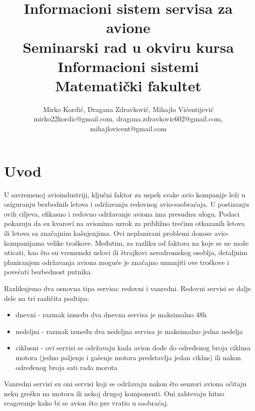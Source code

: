 \documentclass[a4paper]{article}
\begin{document}
\title{Informacioni sistem servisa za avione\\ \small{Seminarski rad u okviru kursa\\Informacioni sistemi\\ Matematički fakultet}}

\author{Mirko Kordić, Dragana Zdravković, Mihajlo Vićentijević\\ mirko22kordic@gmail.com, dragana.zdravkovic602@gmail.com, \\mihajlovicent@gmail.com}


\maketitle

\tableofcontents

\newpage

\section{Uvod}
\label{sec:uvod}
U savremenoj avioindustriji, ključni faktor za uspeh svake avio kompanije leži u osiguranju bezbednih letova i održavanju redovnog avio-saobraćaja. U postizanju ovih ciljeva, efikasno i redovno održavanje aviona ima presudnu ulogu. Podaci pokazuju da su kvarovi na avionima uzrok za približno trećinu otkazanih letova ili letova sa značajnim kašnjenjima. Ovi neplanirani problemi donose avio-kompanijama velike troškove. Međutim, za razliku od faktora na koje se ne može uticati, kao što su vremenski uslovi ili štrajkovi aerodromskog osoblja, detaljnim planiranjem održavanja aviona moguće je značajno umanjiti ove troškove i povećati bezbednost putnika.

Razlikujemo dva osnovna tipa servisa: redovni i vanredni. Redovni servisi se dalje dele na tri različita podtipa:
\begin{itemize}
    \item dnevni - razmak između dva dnevna servisa je maksimalno 48h
    \item nedeljni - razmak između dva nedeljna servisa je maksimalno jedna nedelja
    \item ciklusni - ovi servisi se održavaju kada avion dođe do određenog broja ciklusa motora (jedno paljenje i gašenje motora predstavlja jedan ciklus) ili nakon određenog broja sati rada morota
\end{itemize}

Vanredni servisi su oni servisi koji se održavaju nakon što senzori aviona očitaju neku grešku na motoru ili nekoj drugoj komponenti. Oni zahtevaju hitno reagovanje kako bi se avion što pre vratio u saobraćaj. 
\end{document}
